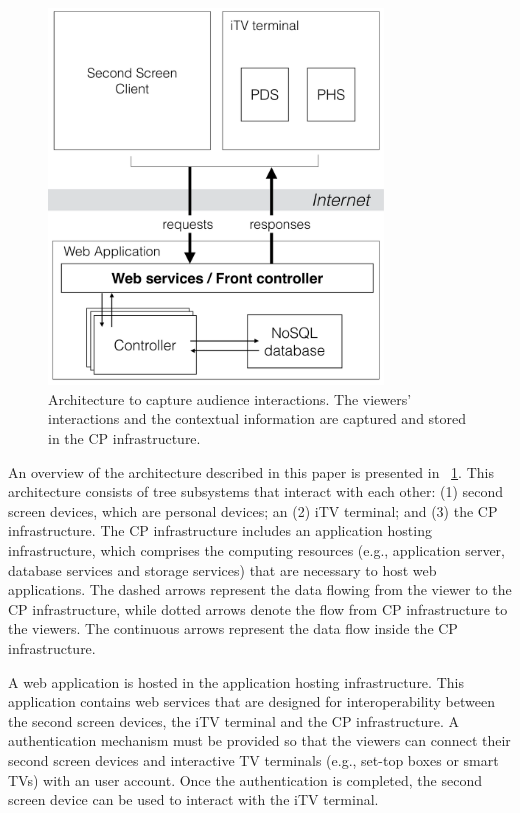 \documentclass[journal]{IEEEtran}
\begin{document}
\begin{figure}[!t]
	\centering
	\includegraphics[width=3.5in]{img/architecture-overview.pdf}
	\caption{Architecture to capture audience interactions. The viewers' interactions and the contextual information are captured and stored in the CP infrastructure.}
	\label{fig_architecture}
\end{figure}

An overview of the architecture described in this paper is presented in \figurename~\ref{fig_architecture}. This architecture consists of tree subsystems that interact with each other: (1) second screen devices, which are personal devices; an (2) iTV terminal; and (3) the CP infrastructure. The CP infrastructure includes an application hosting infrastructure, which comprises the computing resources (e.g., application server, database services and storage services) that are necessary to host web applications. The dashed arrows represent the data flowing from the viewer to the CP infrastructure, while dotted arrows denote the flow from CP infrastructure to the viewers. The continuous arrows represent the data flow inside the CP infrastructure.

A web application is hosted in the application hosting infrastructure. This application contains web services that are designed for interoperability between the second screen devices, the iTV terminal and the CP infrastructure. A authentication mechanism must be provided so that the viewers can connect their second screen devices and interactive TV terminals (e.g., set-top boxes or smart TVs) with an user account. Once the authentication is completed, the second screen device can be used to interact with the iTV terminal.
\end{document}
